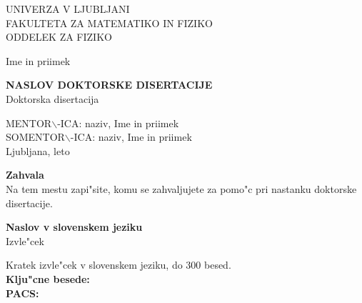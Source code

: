 
\pagestyle{empty}
\begin{center}

{\large UNIVERZA V LJUBLJANI\\
FAKULTETA ZA MATEMATIKO IN FIZIKO\\
ODDELEK ZA FIZIKO\\}

\vspace{4cm}

{\Large Ime in priimek\\}

\vspace{10mm}

{\bf \Large NASLOV DOKTORSKE DISERTACIJE}\\
\vspace{5mm}
{\sc Doktorska disertacija}\\

\vfill

{\large MENTOR$\backslash$-ICA: naziv, Ime in priimek\\
SOMENTOR$\backslash$-ICA: naziv, Ime in priimek\\

\vspace{2cm}
Ljubljana, leto}

\end{center}


\cleardoublepage
\mbox{}
\vfill
{\Large \bf Zahvala}
\vspace{1cm}\\
Na tem mestu zapi"site, komu se zahvaljujete za pomo"c pri nastanku doktorske disertacije.


\cleardoublepage
\begin{center}
{\bf Naslov v slovenskem jeziku}\\[3mm]
{\sc  Izvle"cek}
\end{center}
\vspace{10mm}
Kratek izvle"cek v slovenskem jeziku, do 300 besed.\\[10mm]
{\bf Klju"cne besede:}\\[3mm]
{\bf PACS:}

